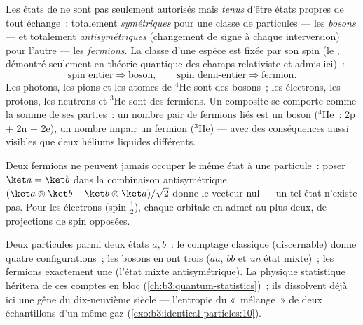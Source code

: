 \begin{theorem}\label{thm:b3:identical-particles:postulate}
Les états de  ne sont pas seulement autorisés
mais \emph{tenus} d'être états propres de tout échange~: totalement
\emph{symétriques} pour une classe de particules --- les
\emph{bosons} --- et totalement \emph{antisymétriques} (changement de
signe à chaque interversion) pour l'autre --- les \emph{fermions}. La
classe d'une espèce est fixée par son spin (le \emph{}, démontré seulement en théorie quantique des champs
relativiste et admis ici)~:
\[
\text{spin entier} \Rightarrow \text{boson} , \qquad
\text{spin demi-entier} \Rightarrow \text{fermion} .
\]
Les photons, les pions et les atomes de $^4$He sont des bosons~; les
électrons, les protons, les neutrons et $^3$He sont des fermions.
Un composite se comporte comme la somme de ses parties~: un nombre
pair de fermions liés est un boson ($^4$He~: 2p + 2n + 2e), un nombre
impair un fermion ($^3$He) --- avec des conséquences aussi visibles
que deux héliums liquides différents.
\end{theorem}
\admitted

\begin{corollary}\label{cor:b3:identical-particles:pauli}
Deux fermions ne peuvent jamais occuper le même état à une particule~:
poser $\ket a = \ket b$ dans la combinaison antisymétrique
$(\ket a\otimes\ket b - \ket b\otimes\ket a)/\sqrt2$ donne le vecteur
nul --- un tel état n'existe pas. Pour les électrons (spin
$\tfrac12$), chaque orbitale en admet au plus deux, de projections de
spin opposées.
\end{corollary}

\begin{example}\label{ex:b3:identical-particles:counting}
Deux particules parmi deux états $a, b$~: le comptage classique
(discernable) donne quatre configurations~; les bosons en ont trois
($aa$, $bb$ et \emph{un} état mixte)~; les fermions exactement une
(l'état mixte antisymétrique). La physique statistique héritera de ces
comptes en bloc (\cref{ch:b3:quantum-statistics})~; ils dissolvent
déjà ici une gêne du dix-neuvième siècle --- l'entropie du
«~mélange~» de deux échantillons d'un même gaz
(\cref{exo:b3:identical-particles:10}).
\end{example}

